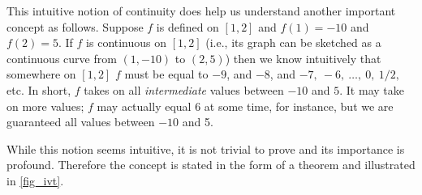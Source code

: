 This intuitive notion of continuity does help us understand another important concept as follows. Suppose $f$ is defined on $[1,2]$ and $f(1) = -10$ and $f(2) = 5$. If $f$ is continuous on $[1,2]$ (i.e., its graph can be sketched as a continuous curve from $(1,-10)$ to $(2,5)$) then we know intuitively that somewhere on $[1,2]$ $f$ must be equal to $-9$, and $-8$, and $-7,\ -6,\ \dotsc,\ 0,\ 1/2,$ etc. In short, $f$ takes on all \textit{intermediate} values between $-10$ and $5$. It may take on more values; $f$ may actually equal 6 at some time, for instance, but we are guaranteed all values between $-10$ and 5. 

While this notion seems intuitive, it is not trivial to prove and its importance is profound. Therefore the concept is stated in the form of a theorem and illustrated in \autoref{fig_ivt}.

